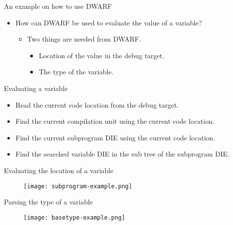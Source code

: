 \begin{frame}{An example on how to use DWARF}
	\begin{itemize}
	    \item How can DWARF be used to evaluate the value of a variable?
		\begin{itemize}
		    \item Two things are needed from DWARF.
			\begin{itemize}
			    \item Location of the value in the debug target.
			    \item The type of the variable.
			\end{itemize}
		\end{itemize}
	\end{itemize}
\end{frame}


\begin{frame}{Evaluating a variable}
	\begin{itemize}
		\item Read the current code location from the debug target.
		\item Find the current compilation unit using the current code location.
		\item Find the current subprogram DIE using the current code location.
		\item Find the searched variable DIE in the sub tree of the subprogram DIE. 
	\end{itemize}
\end{frame}


\begin{frame}{Evaluating the location of a variable}
	\begin{figure}
		\texttt{[image: subprogram-example.png]}
	\end{figure}
\end{frame}


\begin{frame}{Parsing the type of a variable}
	\begin{figure}
		\texttt{[image: basetype-example.png]}
	\end{figure}
\end{frame}

